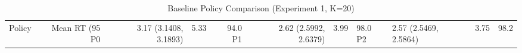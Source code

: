 \begin{table}[htbp]
\centering
\caption{Baseline Policy Comparison (Experiment 1, K=20)}
\label{tab:baseline}
\begin{tabular}{lrrrrrr}
\toprule
Policy & Mean RT (95%
\midrule
P0 & 3.17 (3.1408, 3.1893) & 5.33 & 94.0%
P1 & 2.62 (2.5992, 2.6379) & 3.99 & 98.0%
P2 & 2.57 (2.5469, 2.5864) & 3.75 & 98.2%
\bottomrule
\end{tabular}
\end{table}